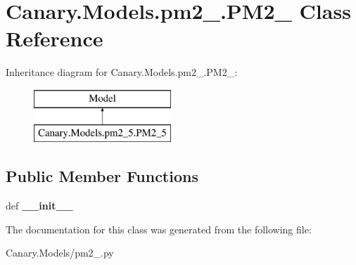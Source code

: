 \hypertarget{class_canary_8_models_1_1pm2__5_1_1_p_m2__5}{\section{Canary.\-Models.\-pm2\-\_.\-P\-M2\-\_ Class Reference}
\label{class_canary_8_models_1_1pm2__5_1_1_p_m2__5}
}
Inheritance diagram for Canary.\-Models.\-pm2\-\_.\-P\-M2\-\_\-:\begin{figure}[H]
\begin{center}
\leavevmode
\includegraphics[height=2.000000cm]{class_canary_8_models_1_1pm2__5_1_1_p_m2__5}
\end{center}
\end{figure}
\subsection*{Public Member Functions}
\begin{DoxyCompactItemize}
\item 
\hypertarget{class_canary_8_models_1_1pm2__5_1_1_p_m2__5_a7aa1824cbd9b4d988785b859f3efcc9a}{def {\bfseries \-\_\-\-\_\-init\-\_\-\-\_\-}}\label{class_canary_8_models_1_1pm2__5_1_1_p_m2__5_a7aa1824cbd9b4d988785b859f3efcc9a}

\end{DoxyCompactItemize}


The documentation for this class was generated from the following file\-:\begin{DoxyCompactItemize}
\item 
Canary.\-Models/pm2\-\_.\-py\end{DoxyCompactItemize}
